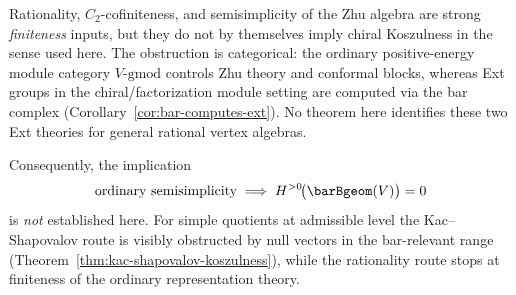 \begin{remark}
\label{rem:rationality-not-koszul-criterion}
Rationality, $C_2$-cofiniteness, and semisimplicity of the Zhu
algebra are strong \emph{finiteness} inputs, but they do not by
themselves imply chiral Koszulness in the sense used here.
The obstruction is categorical: the ordinary positive-energy module
category $V$-$\mathrm{gmod}$ controls Zhu theory and conformal
blocks, whereas Ext groups in the
chiral/factorization module setting are computed via the bar complex
\textup{(}Corollary~\ref{cor:bar-computes-ext}\textup{)}.
No theorem here identifies these two Ext theories for general rational
vertex algebras.

Consequently, the implication
\[
\text{ordinary semisimplicity}
\;\Longrightarrow\;
H^{>0}\!\bigl(\barBgeom(V)\bigr)=0
\]
is \emph{not} established here. For simple quotients at
admissible level the Kac--Shapovalov route is visibly obstructed
by null vectors in the bar-relevant range
\textup{(}Theorem~\ref{thm:kac-shapovalov-koszulness}\textup{)},
while the rationality route stops at finiteness of the ordinary
representation theory.
\end{remark}

